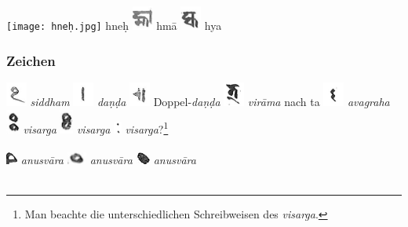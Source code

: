 \documentclass[a4paper,12pt]{article}
\begin{document}
{\texttt{[image: hneḥ.jpg]} hneḥ \includegraphics[height=8.0mm]{hmā.jpg} hmā \includegraphics[height=8.0mm]{hya.jpg} hya

\clearpage

\subsubsection{Zeichen}
\includegraphics[height=8.0mm]{siddham.jpg} \textit{siddham} \includegraphics[height=8.0mm]{daṇḍa.jpg} \textit{daṇḍa} \includegraphics[height=8.0mm]{doubledaṇḍa.jpg} Doppel-\textit{daṇḍa} \includegraphics[height=8.0mm]{viramat.jpg} \textit{virāma} nach ta \includegraphics[height=8.0mm]{avagraha.jpg} \textit{avagraha}
\\
\includegraphics[height=8.0mm]{visarga1.jpg} \textit{visarga} \includegraphics[height=8.0mm]{visarga2.jpg} \textit{visarga} \includegraphics[height=4.0mm]{zeichenx.png} \textit{visarga}?\footnote{Man beachte die unterschiedlichen Schreibweisen des \textit{visarga}.}
\\ \\\includegraphics[height=4.0mm]{anusvara.jpg} \textit{anusvāra} \includegraphics[height=4.0mm]{anusvara1.jpg} \textit{anusvāra} \includegraphics[height=4.0mm]{anusvara2.jpg} \textit{anusvāra} \\ \\
}
\end{document}
